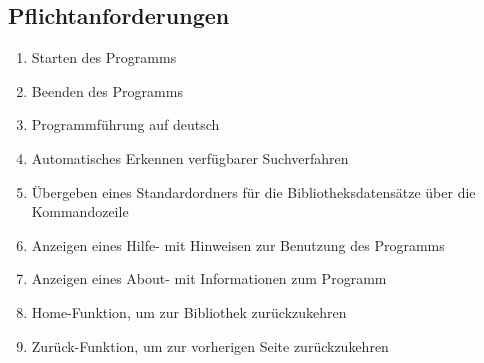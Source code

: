 \subsection{Pflichtanforderungen}
\begin{enumerate} [label=\bfseries /F \arabic*0/, leftmargin=*]
	\item Starten des Programms \label{f:programmstart}
	\item Beenden des Programms \label{f:beenden}
	\item Programmführung auf deutsch
	\item Automatisches Erkennen verfügbarer Suchverfahren \label{f:erkennen_suchverfahren}
	\item Übergeben eines Standardordners für die Bibliotheksdatensätze über die Kommandozeile
	\item Anzeigen eines Hilfe- mit Hinweisen zur Benutzung des Programms \label{f:hilfe}
	\item Anzeigen eines About- mit Informationen zum Programm \label{f:about}
	\item Home-Funktion, um zur Bibliothek zurückzukehren
	\item Zurück-Funktion, um zur vorherigen Seite zurückzukehren
	\newline
 

\end{enumerate}
